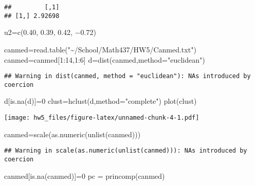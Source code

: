 \documentclass[
]{article}
\newenvironment{Shaded}{\begin{snugshade}}{\end{snugshade}}
\newcommand{\AttributeTok}[1]{\textcolor[rgb]{0.77,0.63,0.00}{#1}}
\newcommand{\DecValTok}[1]{\textcolor[rgb]{0.00,0.00,0.81}{#1}}
\newcommand{\FunctionTok}[1]{\textcolor[rgb]{0.00,0.00,0.00}{#1}}
\newcommand{\NormalTok}[1]{#1}
\newcommand{\OtherTok}[1]{\textcolor[rgb]{0.56,0.35,0.01}{#1}}
\newcommand{\SpecialCharTok}[1]{\textcolor[rgb]{0.00,0.00,0.00}{#1}}
\newcommand{\StringTok}[1]{\textcolor[rgb]{0.31,0.60,0.02}{#1}}
\begin{document}
\begin{verbatim}
##         [,1]
## [1,] 2.92698
\end{verbatim}

u2=c(0.40, 0.39, 0.42, −0.72)

\begin{Shaded}
\begin{Highlighting}[]
\NormalTok{canmed}\OtherTok{=}\FunctionTok{read.table}\NormalTok{(}\StringTok{"\textasciitilde{}/School/Math437/HW5/Canmed.txt"}\NormalTok{)}
\NormalTok{canmed}\OtherTok{=}\NormalTok{canmed[}\DecValTok{1}\SpecialCharTok{:}\DecValTok{14}\NormalTok{,}\DecValTok{1}\SpecialCharTok{:}\DecValTok{6}\NormalTok{]}
\NormalTok{d}\OtherTok{=}\FunctionTok{dist}\NormalTok{(canmed,}\AttributeTok{method=}\StringTok{"euclidean"}\NormalTok{)}
\end{Highlighting}
\end{Shaded}

\begin{verbatim}
## Warning in dist(canmed, method = "euclidean"): NAs introduced by coercion
\end{verbatim}

\begin{Shaded}
\begin{Highlighting}[]
\NormalTok{d[}\FunctionTok{is.na}\NormalTok{(d)]}\OtherTok{=}\DecValTok{0}
\NormalTok{clust}\OtherTok{=}\FunctionTok{hclust}\NormalTok{(d,}\AttributeTok{method=}\StringTok{"complete"}\NormalTok{)}
\FunctionTok{plot}\NormalTok{(clust)}
\end{Highlighting}
\end{Shaded}

\texttt{[image: hw5\_files/figure-latex/unnamed-chunk-4-1.pdf]}

\begin{Shaded}
\begin{Highlighting}[]
\NormalTok{canmed}\OtherTok{=}\FunctionTok{scale}\NormalTok{(}\FunctionTok{as.numeric}\NormalTok{(}\FunctionTok{unlist}\NormalTok{(canmed)))}
\end{Highlighting}
\end{Shaded}

\begin{verbatim}
## Warning in scale(as.numeric(unlist(canmed))): NAs introduced by coercion
\end{verbatim}

\begin{Shaded}
\begin{Highlighting}[]
\NormalTok{canmed[}\FunctionTok{is.na}\NormalTok{(canmed)]}\OtherTok{=}\DecValTok{0}
\NormalTok{pc }\OtherTok{=} \FunctionTok{princomp}\NormalTok{(canmed)}
\end{Highlighting}
\end{Shaded}
\end{document}
